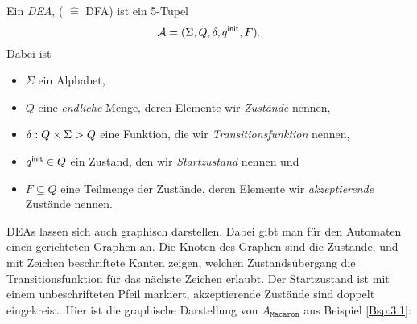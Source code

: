 \begin{Def}
        Ein \emph{\acf{DEA}}, ( $\hat=$ \acl{DFA}) ist ein 5-Tupel
        \[ \mathcal{A}= (\Sigma, Q,\delta,{q^\mathsf{init}},F). \]
Dabei ist
        \begin{itemize}
                \item $\Sigma$ ein Alphabet,
                \item $Q$ eine \emph{endliche} Menge, deren Elemente wir \emph{Zustände} nennen,
                \item $\delta:Q\times\Sigma\->Q$ eine Funktion, die wir \emph{Transitionsfunktion} nennen,
                \item ${q^\mathsf{init}}\in Q$ ein Zustand, den wir \emph{Startzustand} nennen und
                \item $F\subseteq Q$ eine Teilmenge der Zustände, deren Elemente wir \emph{akzeptierende} Zustände nennen.
                \qedhere
        \end{itemize}
\end{Def}

DEAs lassen sich auch graphisch darstellen.
Dabei gibt man für den Automaten einen gerichteten Graphen an.
Die Knoten des Graphen sind die Zustände, und mit Zeichen beschriftete Kanten zeigen, welchen Zustandsübergang die Transitionsfunktion für das nächste Zeichen erlaubt.
Der Startzustand ist mit einem unbeschrifteten Pfeil markiert, akzeptierende Zustände sind doppelt eingekreist.
Hier ist die graphische Darstellung von $A_{\mathtt{Macaron}}$ aus Beispiel \ref{Bsp:3.1}:

